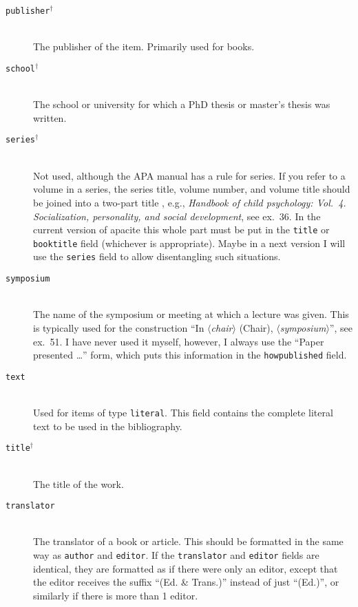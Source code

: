 \documentclass{article}
\newcommand{\LC}{\mbox{${}^{\dag}$}}%
\newcommand{\pkg}[1]{\textsf{#1}}%
\newcommand{\fieldname}[1]{\texttt{#1}}%
\newcommand{\entryname}[1]{\texttt{#1}}%
\newcommand{\opt}[1]{$\langle${\itshape #1}$\rangle$}%
\begin{document}
\begin{description}
    \item[\fieldname{publisher}\LC] \mbox{}\\
        The publisher of the item. Primarily used for books.

    \item[\fieldname{school}\LC] \mbox{}\\
        The school or university for which a PhD thesis or
        master's thesis was written.

    \item[\fieldname{series}\LC] \mbox{}\\
        Not used, although the APA manual has a rule for series.
        If you refer to a volume in a series, the series title,
        volume number, and volume title should be joined into
        a two-part title , e.g., \emph{Handbook of child psychology:
        Vol.~4. Socialization, personality, and social development},
        see ex.~36. In the current version of \pkg{apacite} this
        whole part must be put in the \fieldname{title} or
        \fieldname{booktitle} field (whichever is appropriate).
        Maybe in a next version I will use the \fieldname{series}
        field to allow disentangling such situations.

    \item[\fieldname{symposium}] \mbox{}\\
        The name of the symposium or meeting at which a
        lecture was given. This is typically used for the
        construction ``In \opt{chair} (Chair), \opt{symposium}'',
        see ex.~51. I have never used it myself, however,
        I always use the ``Paper presented \ldots'' form,
        which puts this information in the \fieldname{howpublished}
        field.

    \item[\fieldname{text}] \mbox{}\\
        Used for items of type \entryname{literal}. This field contains
        the complete literal text to be used in the bibliography.

    \item[\fieldname{title}\LC] \mbox{}\\
        The title of the work.

    \item[\fieldname{translator}] \mbox{}\\
        The translator of a book or article. This should
        be formatted in the same way as \fieldname{author} and
        \fieldname{editor}. If the \fieldname{translator} and
        \fieldname{editor} fields are identical, they are
        formatted as if there were only an editor, except that the
        editor receives the suffix ``(Ed. \& Trans.)'' instead of
        just ``(Ed.)'', or similarly if there is more than 1 editor.


\end{description}
\end{document}
